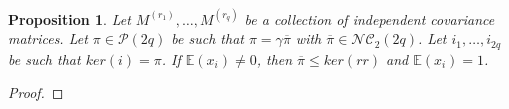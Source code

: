 \documentclass{article}
\newtheorem{proposition}[theorem]{Proposition}
\theoremstyle{definition}
\newcommand{\E}{\mathbb{E}}
\newcommand{\cP}{\mathcal{P}}
\newcommand{\NC}{\mathcal{NC}}
\newcommand{\Tr}{\text{Tr}}
\begin{document}
{%

\begin{proposition}\label{Proposition: contribution of double tree}
Let $M^{(r_1)},\dots, M^{(r_q)}$ be a collection of independent covariance matrices. Let $\pi\in \cP(2q)$ be such that $\pi=\gamma\overline{\pi}$ with $\overline{\pi}\in \NC_2(2q)$. Let $i_1,\dots,i_{2q}$ be such that $ker(i)=\pi$. If $\E(x_i)\neq 0$, then $\overline{\pi}\leq ker(rr)$ and $\E(x_i)=1$. 
\end{proposition}
\begin{proof}


\end{proof}}
\end{document}

